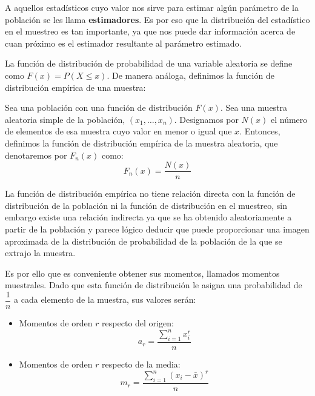 A aquellos estad\'isticos cuyo valor nos sirve para estimar alg\'un par\'ametro de la poblaci\'on se les llama \textbf{estimadores}. Es por eso que la distribuci\'on del estad\'istico en el muestreo es tan importante, ya que nos puede dar informaci\'on acerca de cuan pr\'oximo es el estimador resultante al par\'ametro estimado.


La funci\'on de distribuci\'on de probabilidad de una variable aleatoria se define como $F(x)=P(X\leq x)$. De manera an\'aloga, definimos la funci\'on de distribuci\'on emp\'irica de una muestra:
\begin{definicion}
Sea una poblaci\'on con una funci\'on de distribuci\'on $F(x)$. Sea una muestra aleatoria simple de la poblaci\'on, $(x_1,\ldots,x_n)$. Designamos por $N(x)$ el n\'umero de elementos de esa muestra cuyo valor en menor o igual que $x$. Entonces, definimos la funci\'on de distribuci\'on emp\'irica de la muestra aleatoria, que denotaremos por $F_n(x)$ como:
\begin{equation*}
F_n(x)=\dfrac{N(x)}{n}
\end{equation*}
\end{definicion}


La funci\'on de distribuci\'on emp\'irica no tiene relaci\'on directa con la funci\'on de distribuci\'on de la poblaci\'on ni la funci\'on de distribuci\'on en el muestreo, sin embargo existe una relaci\'on indirecta ya que se ha obtenido aleatoriamente a partir de la poblaci\'on y parece l\'ogico deducir que puede proporcionar una imagen aproximada de la distribuci\'on de probabilidad de la poblaci\'on de la que se extrajo la muestra.

Es por ello que es conveniente obtener sus momentos, llamados momentos muestrales. Dado que esta funci\'on de distribuci\'on le asigna una probabilidad de $\dfrac{1}{n}$ a cada elemento de la muestra, sus valores ser\'an:
\begin{itemize}
\item Momentos de orden $r$ respecto del origen:
\begin{equation*}
a_r=\dfrac{\sum_{i=1}^nx_i^r}{n}
\end{equation*}
\item Momentos de orden $r$ respecto de la media:
\begin{equation*}
m_r=\dfrac{\sum_{i=1}^n\left(x_i-\bar{x}\right)^r}{n}
\end{equation*}
\end{itemize}

